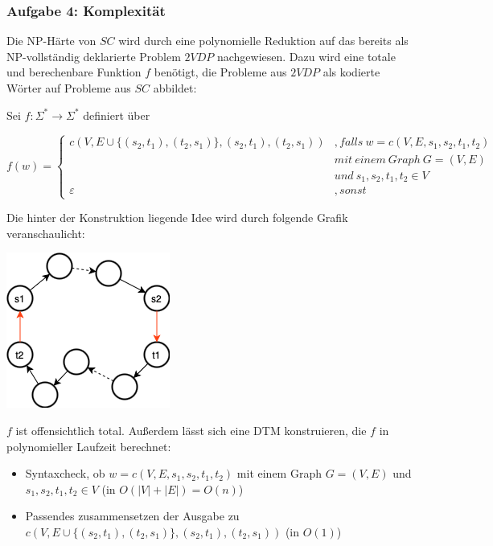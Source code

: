 \subsubsection{Aufgabe 4: Komplexität}
\begin{teile}
	\item
	Die NP-Härte von $SC$ wird durch eine polynomielle Reduktion auf das bereits als NP-vollständig deklarierte Problem $2VDP$ nachgewiesen. Dazu wird eine totale und berechenbare Funktion $f$ benötigt, die Probleme aus $2VDP$ als kodierte Wörter auf Probleme aus $SC$ abbildet:

	Sei $f:\Sigma^*\rightarrow \Sigma^*$ definiert über

	$f(w)=\begin{cases}
		c(V,E\cup \{(s_2,t_1),(t_2,s_1)\},(s_2,t_1),(t_2,s_1))&, falls\ w=c(V,E,s_1,s_2,t_1,t_2)\\
		&mit\ einem\ Graph\ G=(V,E)\\
		&und\ s_1,s_2,t_1,t_2 \in V\\
		\varepsilon &, sonst
	\end{cases}$

	Die hinter der Konstruktion liegende Idee wird durch folgende Grafik veranschaulicht:

	\includegraphics[scale=0.5]{skizze_reduktion.png}
	
	$f$ ist offensichtlich total. Außerdem lässt sich eine DTM konstruieren, die $f$ in polynomieller Laufzeit berechnet:
	\begin{itemize}
		\item Syntaxcheck, ob $w=c(V,E,s_1,s_2,t_1,t_2)$ mit einem Graph $G=(V,E)$ und $s_1,s_2,t_1,t_2 \in V$ (in $O(|V|+|E|)=O(n)$)
		\item Passendes zusammensetzen der Ausgabe zu $c(V,E\cup \{(s_2,t_1),(t_2,s_1)\},(s_2,t_1),(t_2,s_1))$ (in $O(1)$)
	\end{itemize}


\end{teile}
